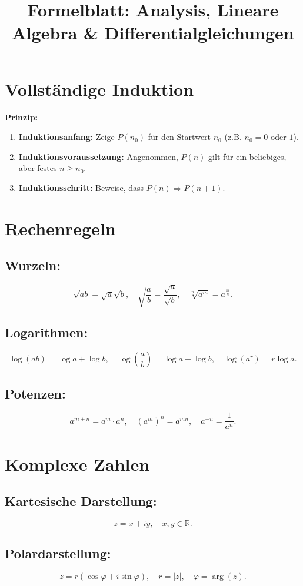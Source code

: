 \documentclass[12pt]{article}
\title{Formelblatt: Analysis, Lineare Algebra \& Differentialgleichungen}
\author{}
\date{}
\begin{document}
\maketitle

\section{Vollständige Induktion}
\textbf{Prinzip:}
\begin{enumerate}[label=\arabic*.]
  \item \textbf{Induktionsanfang:} Zeige \(P(n_0)\) für den Startwert \(n_0\) (z.B. \(n_0=0\) oder \(1\)).
  \item \textbf{Induktionsvoraussetzung:} Angenommen, \(P(n)\) gilt für ein beliebiges, aber festes \(n \ge n_0\).
  \item \textbf{Induktionsschritt:} Beweise, dass \(P(n) \Rightarrow P(n+1)\).
\end{enumerate}

\section{Rechenregeln}
\subsection*{Wurzeln:}
\[
\sqrt{ab} = \sqrt{a}\sqrt{b}, \quad \sqrt{\frac{a}{b}} = \frac{\sqrt{a}}{\sqrt{b}}, \quad \sqrt[n]{a^m} = a^{\frac{m}{n}}.
\]
\subsection*{Logarithmen:}
\[
\log(ab) = \log a + \log b, \quad \log\left(\frac{a}{b}\right) = \log a - \log b, \quad \log(a^r)=r\log a.
\]
\subsection*{Potenzen:}
\[
a^{m+n} = a^m \cdot a^n, \quad (a^m)^n = a^{mn}, \quad a^{-n} = \frac{1}{a^n}.
\]

\section{Komplexe Zahlen}
\subsection*{Kartesische Darstellung:}
\[
z = x + iy,\quad x,y \in \mathbb{R}.
\]
\subsection*{Polardarstellung:}
\[
z = r (\cos\varphi + i \sin\varphi),\quad r=|z|,\quad \varphi=\arg(z).
\]
\end{document}
